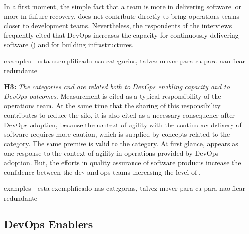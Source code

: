In a first moment, the simple fact that a team is more
 in delivering software, or more  in failure recovery, does not
contribute directly to bring operations teams closer to development teams.
Nevertheless, the respondents of the interviews frequently cited that DevOps
increases the capacity for continuously delivering software ()
and for building  infrastructures.

{\color{red}examples - esta exemplificado nas categorias, talvez mover para ca
para nao ficar redundante}

\textbf{H3:} \textit{The categories  and 
are related both to DevOps enabling capacity and to DevOps outcomes}.
Measurement is cited as a typical responsibility of the operations team.
At the same time that the sharing of this responsibility contributes to reduce the silo,
it is also cited as a necessary consequence after DevOps adoption, because
the context of agility with the continuous delivery of software requires more caution,
which is supplied by concepts related to the  category.
The same premise is valid to the  category. At first glance,
 appears as one response to the context of agility in operations
provided by DevOps adoption. But, the efforts in quality assurance of software products
increase the confidence between the dev and ops teams increasing the level
of .

{\color{red}examples - esta exemplificado nas categorias, talvez mover para ca
para nao ficar redundante}

\subsection{DevOps Enablers}

